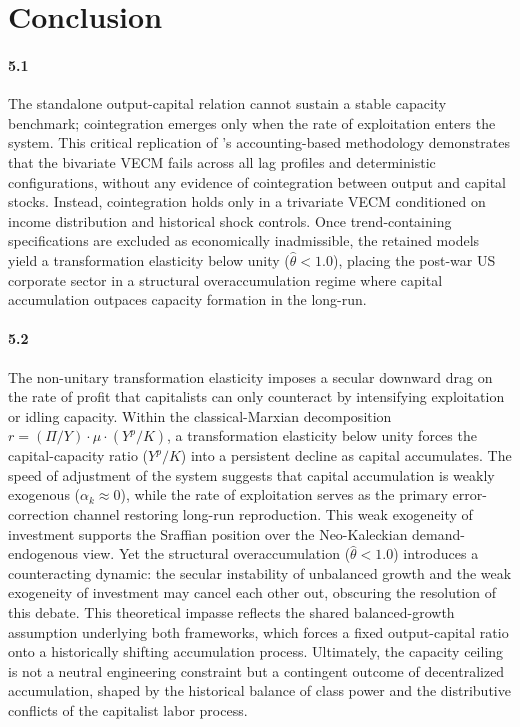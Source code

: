 \section{Conclusion}
\label{sec:conclusion}

\paragraph{5.1}
The standalone output-capital relation cannot sustain a stable capacity benchmark; cointegration emerges only when the rate of exploitation enters the system. This critical replication of \citet{Shaikh2016}'s accounting-based methodology demonstrates that the bivariate VECM fails across all lag profiles and deterministic configurations, without any evidence of cointegration between output and capital stocks. Instead, cointegration holds only in a trivariate VECM conditioned on income distribution and historical shock controls. Once trend-containing specifications are excluded as economically inadmissible, the retained models yield a transformation elasticity below unity ($\hat{\theta} < 1.0$), placing the post-war US corporate sector in a structural overaccumulation regime where capital accumulation outpaces capacity formation in the long-run.

\paragraph{5.2}
The non-unitary transformation elasticity imposes a secular downward drag on the rate of profit that capitalists can only counteract by intensifying exploitation or idling capacity. Within the classical-Marxian decomposition $r = (\Pi/Y) \cdot \mu \cdot (Y^p/K)$, a transformation elasticity below unity forces the capital-capacity ratio ($Y^p/K$) into a persistent decline as capital accumulates. The speed of adjustment of the system suggests that capital accumulation is weakly exogenous ($\alpha_k \approx 0$), while the rate of exploitation serves as the primary error-correction channel restoring long-run reproduction. This weak exogeneity of investment supports the Sraffian position over the Neo-Kaleckian demand-endogenous view. Yet the structural overaccumulation ($\hat{\theta} < 1.0$) introduces a counteracting dynamic: the secular instability of unbalanced growth and the weak exogeneity of investment may cancel each other out, obscuring the resolution of this debate. This theoretical impasse reflects the shared balanced-growth assumption underlying both frameworks, which forces a fixed output-capital ratio onto a historically shifting accumulation process. Ultimately, the capacity ceiling is not a neutral engineering constraint but a contingent outcome of decentralized accumulation, shaped by the historical balance of class power and the distributive conflicts of the capitalist labor process.


